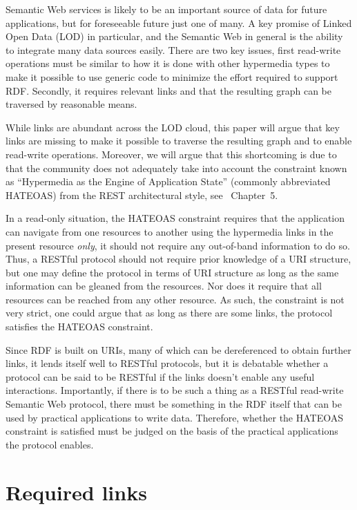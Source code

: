 \documentclass{llncs}
\begin{document}
Semantic Web services is likely to be an important source of data for
future applications, but for foreseeable future just one of many. A
key promise of Linked Open Data (LOD) in particular, and the Semantic
Web in general is the ability to integrate many data sources
easily. There are two key issues, first read-write operations must be
similar to how it is done with other hypermedia types to make it
possible to use generic code to minimize the effort required to
support RDF. Secondly, it requires relevant links and that the
resulting graph can be traversed by reasonable means.

While links are abundant across the LOD cloud, this paper will
argue that key links are missing to make it possible to traverse the
resulting graph and to enable read-write operations. Moreover, we will
argue that this shortcoming is due to that the community does not
adequately take into account the constraint known as ``Hypermedia as
the Engine of Application State'' (commonly abbreviated HATEOAS) from
the REST architectural style, see
\cite{Fielding_2000_Architectural-Styles}~Chapter~5.

In a read-only situation, the HATEOAS constraint requires that the
application can navigate from one resources to another using the
hypermedia links in the present resource \emph{only}, it should not
require any out-of-band information to do so. Thus, a RESTful protocol
should not require prior knowledge of a URI structure, but one may
define the protocol in terms of URI structure as long as the same
information can be gleaned from the resources. Nor does it require
that all resources can be reached from any other resource. As such,
the constraint is not very strict, one could argue that as long as
there are some links, the protocol satisfies the HATEOAS constraint.

Since RDF is built on URIs, many of which can be dereferenced to
obtain further links, it lends itself well to RESTful protocols, but
it is debatable whether a protocol can be said to be RESTful if the
links doesn't enable any useful interactions. Importantly, if there is
to be such a thing as a RESTful read-write Semantic Web protocol,
there must be something in the RDF itself that can be used by
practical applications to write data. Therefore, whether the HATEOAS
constraint is satisfied must be judged on the basis of the practical
applications the protocol enables.

\section{Required links}
\end{document}
